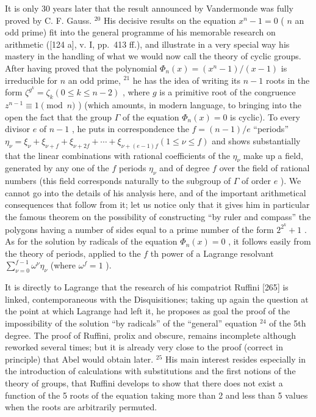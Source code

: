 It is only 30 years later that the result announced by Vandermonde was fully proved by C. F. Gauss. \(^{20}\) His decisive results on the equation \(x^n - 1 = 0\) ( \(n\) an odd prime) fit into the general programme of his memorable research on arithmetic ({[}124 a{]}, v. I, pp.~413 ff.), and illustrate in a very special way his mastery in the handling of what we would now call the theory of cyclic groups. After having proved that the polynomial \(\Phi_n(x) = (x^n - 1)/(x - 1)\) is irreducible for \(n\) an odd prime, \(^{21}\) he has the idea of writing its \(n - 1\) roots in the form \(\zeta^{g^k} = \zeta_k (0 \leq k \leq n - 2)\) , where \(g\) is a primitive root of the congruence \(z^{n-1} \equiv 1 \pmod{n}\) ) (which amounts, in modern language, to bringing into the open the fact that the group \(\Gamma\) of the equation \(\Phi_n(x) = 0\) is cyclic). To every divisor \(e\) of \(n-1\) , he puts in correspondence the \(f = (n-1)/e\) ``periods'' \(\eta_\nu = \xi_\nu + \xi_{\nu+f} + \xi_{\nu+2f} + \cdots + \xi_{\nu+(e-1)f} (1 \leq \nu \leq f)\) and shows substantially that the linear combinations with rational coefficients of the \(\eta_{\nu}\) make up a field, generated by any one of the \(f\) periods \(\eta_{\nu}\) and of degree \(f\) over the field of rational numbers (this field corresponds naturally to the subgroup of \(\Gamma\) of order \(e\) ). We cannot go into the details of his analysis here, and of the important arithmetical consequences that follow from it; let us notice only that it gives him in particular the famous theorem on the possibility of constructing ``by ruler and compass'' the polygons having a number of sides equal to a prime number of the form \(2^{2^k} + 1\) . As for the solution by radicals of the equation \(\Phi_n(x) = 0\) , it follows easily from the theory of periods, applied to the \(f\) th power of a Lagrange resolvant \(\sum_{\nu=0}^{f-1} \omega^\nu \eta_\nu\) (where \(\omega^f = 1\) ).

It is directly to Lagrange that the research of his compatriot Ruffini {[}265{]} is linked, contemporaneous with the Disquisitiones; taking up again the question at the point at which Lagrange had left it, he proposes as goal the proof of the impossibility of the solution ``by radicals'' of the ``general'' equation \(^{24}\) of the 5th degree. The proof of Ruffini, prolix and obscure, remains incomplete although reworked several times; but it is already very close to the proof (correct in principle) that Abel would obtain later. \(^{25}\) His main interest resides especially in the introduction of calculations with substitutions and the first notions of the theory of groups, that Ruffini develops to show that there does not exist a function of the 5 roots of the equation taking more than 2 and less than 5 values when the roots are arbitrarily permuted.

